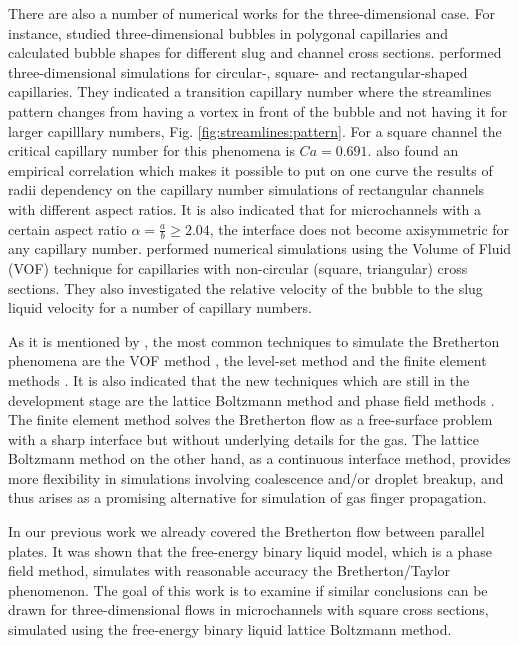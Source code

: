 \documentclass{article}
\begin{document}
There are also a number of numerical works for the three-dimensional case. For instance, 
\citet{wong-films,wong-pressure} studied
three-dimensional bubbles in
polygonal capillaries and calculated bubble shapes for different
slug and channel cross sections.
\citet{heil-threedim} performed three-dimensional simulations for circular-,
square- and rectangular-shaped capillaries. They indicated a transition
capillary number where the streamlines pattern
changes from having a vortex in front of the bubble and not having it for larger capilllary
numbers,  Fig. \ref{fig:streamlines:pattern}. For a square channel the critical
capillary number for this phenomena is $Ca=0.691$.  \citet{heil-threedim} also found an empirical
correlation which
makes it possible to put on one curve the results of radii dependency on the capillary number
simulations of rectangular channels with different aspect ratios.
It is also indicated that for microchannels with a certain aspect ratio $\alpha=\frac{a}{b}\geq
2.04$, the interface does not become
axisymmetric for any capillary number. \citet{wang-non-circular} performed numerical
simulations using the Volume of Fluid (VOF) technique for
capillaries with non-circular (square, triangular) cross sections. They also investigated the relative
velocity of the bubble to the slug liquid velocity  for
a number of capillary numbers. 

As it is mentioned by \citet{gupta-review}, the most common techniques to simulate the Bretherton
phenomena are the VOF method \cite{wang-non-circular}, the level-set method
\cite{fukugata-levelset} and the finite element methods \cite{kreutzer-taylor,heil-threedim}. It is
also indicated \cite{gupta-review} that the new techniques which are still in the development stage
are the lattice Boltzmann method and phase field methods \cite{anderson-diffuse,gurtin-binary}.
The finite element method solves the Bretherton flow as a free-surface problem with a sharp
interface but without underlying details for the gas.  The lattice Boltzmann method on the other
hand,
as a continuous interface method, provides more flexibility in simulations involving coalescence
and/or
droplet breakup, and thus arises as a promising alternative for simulation of gas finger propagation. 

In our previous work \cite{kuzmin-binary2d} we already covered the Bretherton flow between parallel
plates.
It was shown that the free-energy binary liquid model, which is a phase field method, simulates
with reasonable accuracy the Bretherton/Taylor phenomenon. The goal of this work is to examine 
if similar conclusions can be drawn for three-dimensional flows in microchannels with square cross sections,
simulated using the free-energy binary liquid lattice Boltzmann
method. 
\end{document}
